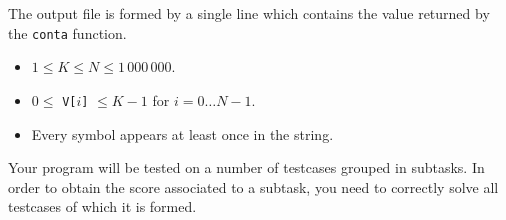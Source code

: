 The output file is formed by a single line which contains the value returned by
the \texttt{conta} function.



\Constraints

\begin{itemize}[nolistsep, itemsep=2mm]
    \item $1 \le K \le N \le 1\,000\,000$.
    \item $0 \le$ \texttt{V[$i$]} $\le K-1$ for $i = 0\dots N-1$.
    \item Every symbol appears at least once in the string.
\end{itemize}



\Scoring

Your program will be tested on a number of testcases grouped in subtasks. In
order to obtain the score associated to a subtask, you need to correctly solve
all testcases of which it is formed.

